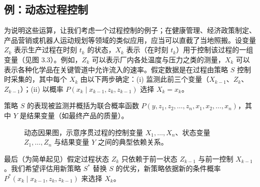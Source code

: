 \subsection*{例：动态过程控制}

为说明这些运算，让我们考虑一个过程控制的例子；在健康管理、经济政策制定、产品营销或机器人运动规划等领域的类似应用，应当可以直截了当地照搬。设变量 $Z_k$ 表示生产过程在时刻 $t_k$ 的状态，$X_k$ 表示（在时刻 $t_k$）用于控制该过程的一组变量（见图 3.3）。例如，$Z_k$ 可以表示厂内各处温度与压力之类的测量，$X_k$ 可以表示各种化学品在关键管道中允许流入的速率。假定数据是在过程由策略 $S$ 控制时采集的，其中每个 $X_k$ 由以下两步确定：(i) 监测此前三个变量（$X_{k-1}$、$Z_k$、$Z_{k-1}$）；(ii) 以概率 $P(x_k\mid x_{k-1},z_k,z_{k-1})$ 选择 $X_k=x_k$。

策略 $S$ 的表现被监测并概括为联合概率函数 $P(y,z_1,z_2,\dots,z_n,x_1,x_2,\dots,x_n)$，其中 $Y$ 是结果变量（如最终产品的质量）。

\begin{figure}[htbp]
\centering
{}
\caption{动态因果图，示意序贯过程的控制变量 $X_1,\dots,X_n$、状态变量 $Z_1,\dots,Z_n$ 与结果变量 $Y$ 之间的典型依赖关系。}
\label{fig:3.3}
\end{figure}

最后（为简单起见）假定过程状态 $Z_k$ 只依赖于前一状态 $Z_{k-1}$ 与前一控制 $X_{k-1}$。我们希望评估用新策略 $S^*$ 替换 $S$ 的优劣，新策略依据新的条件概率 $P^*(x_k\mid x_{k-1},z_k,z_{k-1})$ 来选择 $X_k$。

